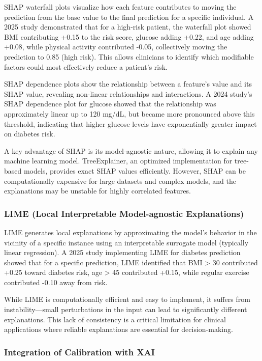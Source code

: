 SHAP waterfall plots visualize how each feature contributes to moving the prediction from the base value to the final prediction for a specific individual. A 2025 study demonstrated that for a high-risk patient, the waterfall plot showed BMI contributing +0.15 to the risk score, glucose adding +0.22, and age adding +0.08, while physical activity contributed -0.05, collectively moving the prediction to 0.85 (high risk). This allows clinicians to identify which modifiable factors could most effectively reduce a patient's risk.

SHAP dependence plots show the relationship between a feature's value and its SHAP value, revealing non-linear relationships and interactions. A 2024 study's SHAP dependence plot for glucose showed that the relationship was approximately linear up to 120 mg/dL, but became more pronounced above this threshold, indicating that higher glucose levels have exponentially greater impact on diabetes risk.

A key advantage of SHAP is its model-agnostic nature, allowing it to explain any machine learning model. TreeExplainer, an optimized implementation for tree-based models, provides exact SHAP values efficiently. However, SHAP can be computationally expensive for large datasets and complex models, and the explanations may be unstable for highly correlated features.

\subsubsection{LIME (Local Interpretable Model-agnostic Explanations)}

LIME generates local explanations by approximating the model's behavior in the vicinity of a specific instance using an interpretable surrogate model (typically linear regression). A 2025 study implementing LIME for diabetes prediction showed that for a specific prediction, LIME identified that BMI > 30 contributed +0.25 toward diabetes risk, age > 45 contributed +0.15, while regular exercise contributed -0.10 away from risk.

While LIME is computationally efficient and easy to implement, it suffers from instability—small perturbations in the input can lead to significantly different explanations. This lack of consistency is a critical limitation for clinical applications where reliable explanations are essential for decision-making.

\subsubsection{Integration of Calibration with XAI}

